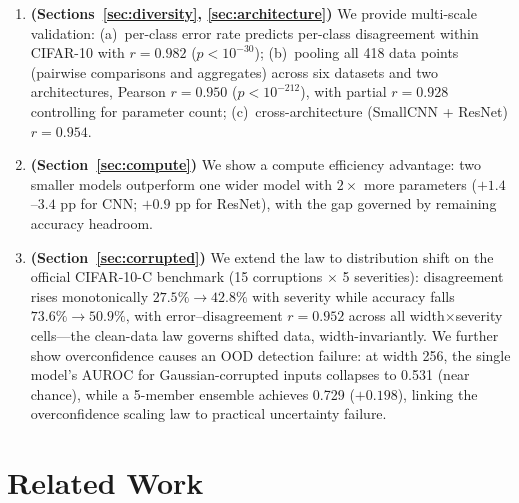 \documentclass[11pt]{article}
\begin{document}
\begin{enumerate}
  \item \textbf{(Sections~\ref{sec:diversity}, \ref{sec:architecture})}
        We provide multi-scale validation: (a)~per-class error rate
        predicts per-class disagreement within CIFAR-10 with $r = 0.982$
        ($p < 10^{-30}$); (b)~pooling all 418 data points (pairwise comparisons and aggregates)
        across six datasets and two architectures, Pearson $r = 0.950$ ($p < 10^{-212}$),
        with partial $r = 0.928$ controlling for parameter count;
        (c)~cross-architecture (SmallCNN + ResNet) $r = 0.954$.

  \item \textbf{(Section~\ref{sec:compute})} We show a compute
        efficiency advantage: two smaller models outperform one wider
        model with $2\times$ more parameters ($+1.4$--$3.4$ pp for CNN;
        $+0.9$ pp for ResNet), with the gap governed by remaining
        accuracy headroom.

  \item \textbf{(Section~\ref{sec:corrupted})} We extend the law to
        distribution shift on the official CIFAR-10-C benchmark (15
        corruptions $\times$ 5 severities): disagreement rises monotonically
        $27.5\%\!\to\!42.8\%$ with severity while accuracy falls
        $73.6\%\!\to\!50.9\%$, with error--disagreement $r=0.952$ across all
        width$\times$severity cells---the clean-data law governs shifted data,
        width-invariantly.  We further show overconfidence causes an OOD
        detection failure: at width 256, the single model's AUROC for
        Gaussian-corrupted inputs collapses to 0.531 (near chance), while a
        5-member ensemble achieves 0.729 ($+0.198$), linking the
        overconfidence scaling law to practical uncertainty failure.
\end{enumerate}

\section{Related Work}
\label{sec:related}
\end{document}
